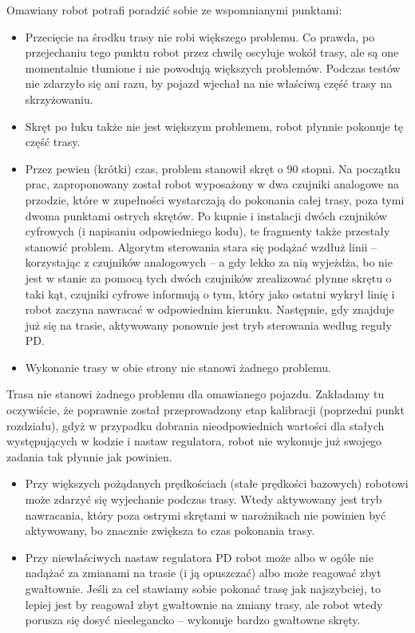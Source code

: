 \documentclass[11pt]{article}
\begin{document}
Omawiany robot potrafi poradzić sobie ze wspomnianymi punktami:
\begin{itemize}
\item Przecięcie na środku trasy nie robi większego problemu. Co prawda, po przejechaniu tego punktu robot przez chwilę oscyluje wokół trasy, ale są one momentalnie tłumione i nie powodują większych problemów. Podczas testów nie zdarzyło się ani razu, by pojazd wjechał na nie właściwą część trasy na skrzyżowaniu.
\item Skręt po łuku także nie jest większym problemem, robot płynnie pokonuje tę część trasy.
\item Przez pewien (krótki) czas, problem stanowił skręt o 90 stopni. Na początku prac, zaproponowany został robot wyposażony w dwa czujniki analogowe na przodzie, które w zupełności wystarczają do pokonania całej trasy, poza tymi dwoma punktami ostrych skrętów. Po kupnie i instalacji dwóch czujników cyfrowych (i napisaniu odpowiedniego kodu), te fragmenty także przestały stanowić problem. Algorytm sterowania stara się podążać wzdłuż linii -- korzystając z czujników analogowych -- a gdy lekko za nią wyjeżdża, bo nie jest w stanie za pomocą tych dwóch czujników zrealizować płynne skrętu o taki kąt, czujniki cyfrowe informują o tym, który jako ostatni wykrył linię i robot zaczyna nawracać w odpowiednim kierunku. Następnie, gdy znajduje już się na trasie, aktywowany ponownie jest tryb sterowania według reguły PD.
\item Wykonanie trasy w obie strony nie stanowi żadnego problemu.
\end{itemize}

Trasa nie stanowi żadnego problemu dla omawianego pojazdu. Zakładamy tu oczywiście, że poprawnie został przeprowadzony etap kalibracji (poprzedni punkt rozdziału), gdyż w przypadku dobrania nieodpowiednich wartości dla stałych występujących w kodzie i nastaw regulatora, robot nie wykonuje już swojego zadania tak płynnie jak powinien.
\begin{itemize}
\item Przy większych pożądanych prędkościach (stałe prędkości bazowych) robotowi może zdarzyć się wyjechanie podczas trasy. Wtedy aktywowany jest tryb nawracania, który poza ostrymi skrętami w narożnikach nie powinien być aktywowany, bo znacznie zwiększa to czas pokonania trasy.
\item Przy niewłaściwych nastaw regulatora PD robot może albo w ogóle nie nadążać za zmianami na trasie (i ją opuszczać) albo może reagować zbyt gwałtownie. Jeśli za cel stawiamy sobie pokonać trasę jak najszybciej, to lepiej jest by reagował zbyt gwałtownie na zmiany trasy, ale robot wtedy porusza się dosyć nieelegancko -- wykonuje bardzo gwałtowne skręty.
\end{itemize}
\end{document}
